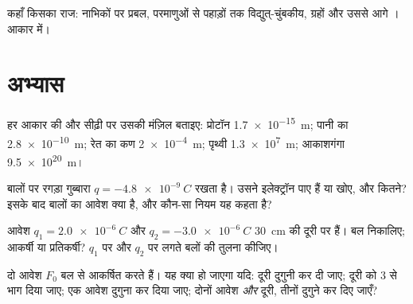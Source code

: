 \begin{omfigure}

{\small कहाँ किसका राज: नाभिकों पर प्रबल, परमाणुओं से पहाड़ों तक
विद्युत्-चुंबकीय, ग्रहों और उससे आगे । आकार
 में।}
\end{omfigure}

\section{अभ्यास}

\begin{exercise}[$\star$]\label{exo:g11:fundamental-interactions:1}
हर आकार की  और सीढ़ी पर उसकी मंज़िल बताइए: प्रोटॉन
\qty{1.7e-15}{m}; पानी का  \qty{2.8e-10}{m}; रेत का कण \qty{2e-4}{m}; पृथ्वी \qty{1.3e7}{m};
आकाशगंगा \qty{9.5e20}{m}।
\end{exercise}

\begin{exercise}[$\star$]\label{exo:g11:fundamental-interactions:2}
बालों पर रगड़ा गुब्बारा $q = \qty{-4.8e-9}{C}$ रखता है। उसने इलेक्ट्रॉन पाए हैं या खोए, और
कितने? इसके बाद बालों का आवेश क्या है, और कौन-सा नियम यह कहता है?
\end{exercise}

\begin{exercise}[$\star$]\label{exo:g11:fundamental-interactions:3}
आवेश $q_1 = \qty{+2.0e-6}{C}$ और $q_2 = \qty{-3.0e-6}{C}$ \qty{30}{cm} की दूरी पर हैं। बल निकालिए; आकर्षी
या प्रतिकर्षी? $q_1$ पर और $q_2$ पर लगते बलों की तुलना कीजिए।
\end{exercise}

\begin{exercise}[$\star$]\label{exo:g11:fundamental-interactions:4}
दो आवेश $F_0$ बल से आकर्षित करते हैं। यह क्या हो जाएगा यदि: दूरी
दुगुनी कर दी जाए; दूरी को $3$ से भाग दिया जाए; एक आवेश दुगुना कर दिया
जाए; दोनों आवेश \emph{और} दूरी, तीनों दुगुने कर दिए जाएँ?
\end{exercise}

